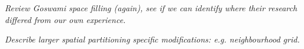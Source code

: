 \textit{Review Goswami space filling (again), see if we can identify where their research differed from our own experience.}

\textit{Describe larger spatial partitioning specific modifications: e.g. neighbourhood grid.}
      

